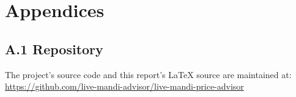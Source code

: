 \appendix
\chapter{Appendices}


\section*{A.1 Repository}
The project's source code and this report's LaTeX source are maintained
at: \url{https://github.com/live-mandi-advisor/live-mandi-price-advisor}
